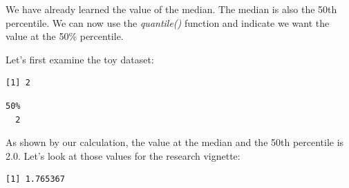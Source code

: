 \documentclass[
  11pt,
]{book}
\newenvironment{Shaded}{\begin{snugshade}}{\end{snugshade}}
\newcommand{\AttributeTok}[1]{\textcolor[rgb]{0.27,0.27,0.27}{#1}}
\newcommand{\ConstantTok}[1]{\textcolor[rgb]{0.37,0.37,0.37}{#1}}
\newcommand{\FloatTok}[1]{\textcolor[rgb]{0.06,0.06,0.06}{#1}}
\newcommand{\FunctionTok}[1]{\textcolor[rgb]{0.27,0.27,0.27}{\textbf{#1}}}
\newcommand{\NormalTok}[1]{#1}
\newcommand{\SpecialCharTok}[1]{\textcolor[rgb]{0.43,0.43,0.43}{\textbf{#1}}}
\begin{document}
We have already learned the value of the median. The median is also the 50th percentile. We can now use the \emph{quantile()} function and indicate we want the value at the 50\% percentile.

Let's first examine the toy dataset:

\begin{Shaded}
\end{Shaded}

\begin{verbatim}
[1] 2
\end{verbatim}

\begin{Shaded}
\end{Shaded}

\begin{verbatim}
50% 
  2 
\end{verbatim}

As shown by our calculation, the value at the median and the 50th percentile is 2.0. Let's look at those values for the research vignette:

\begin{Shaded}
\end{Shaded}

\begin{verbatim}
[1] 1.765367
\end{verbatim}

\begin{Shaded}
\end{Shaded}
\end{document}
